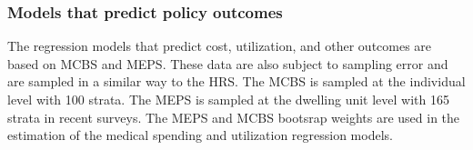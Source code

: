 \subsubsection{Models that predict policy outcomes}
The regression models that predict cost, utilization, and other outcomes are based on MCBS and MEPS. These data are also subject to 
sampling error and are sampled in a similar way to the HRS. The MCBS is sampled at the individual level with 100 strata. The MEPS 
is sampled at the dwelling unit level with 165 strata in recent surveys. The MEPS and MCBS 
bootsrap weights are used in the estimation of the medical spending and utilization regression models.
